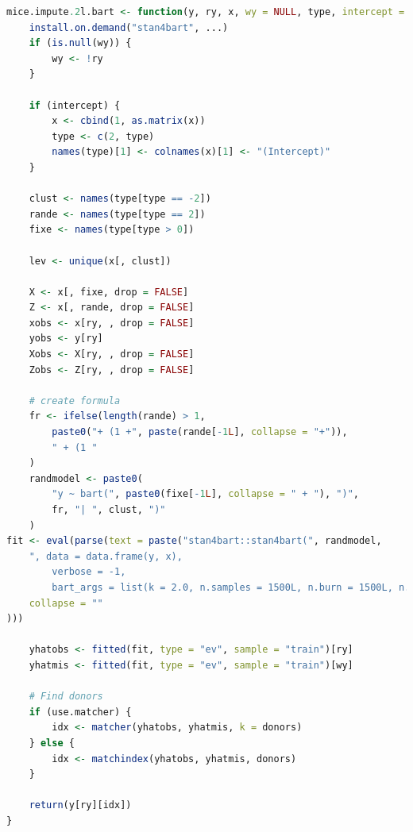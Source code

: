 \documentclass[10pt, a4paper, titlepage]{article}
\begin{document}
\begin{lstlisting}[language=R, caption={Imputation function for multilevel BART with random effects and cross-level interactions}, label={lst:multilevelBART}]
    mice.impute.2l.bart <- function(y, ry, x, wy = NULL, type, intercept = TRUE, use.matcher = FALSE, donors = 5L, ...) {
    install.on.demand("stan4bart", ...)
    if (is.null(wy)) {
        wy <- !ry
    }

    if (intercept) {
        x <- cbind(1, as.matrix(x))
        type <- c(2, type)
        names(type)[1] <- colnames(x)[1] <- "(Intercept)"
    }

    clust <- names(type[type == -2])
    rande <- names(type[type == 2])
    fixe <- names(type[type > 0])

    lev <- unique(x[, clust])

    X <- x[, fixe, drop = FALSE]
    Z <- x[, rande, drop = FALSE]
    xobs <- x[ry, , drop = FALSE]
    yobs <- y[ry]
    Xobs <- X[ry, , drop = FALSE]
    Zobs <- Z[ry, , drop = FALSE]

    # create formula
    fr <- ifelse(length(rande) > 1,
        paste0("+ (1 +", paste(rande[-1L], collapse = "+")),
        " + (1 "
    )
    randmodel <- paste0(
        "y ~ bart(", paste0(fixe[-1L], collapse = " + "), ")",
        fr, "| ", clust, ")"
    )
fit <- eval(parse(text = paste("stan4bart::stan4bart(", randmodel,
    ", data = data.frame(y, x),
        verbose = -1,
        bart_args = list(k = 2.0, n.samples = 1500L, n.burn = 1500L, n.thin = 5L))",
    collapse = ""
)))

    yhatobs <- fitted(fit, type = "ev", sample = "train")[ry]
    yhatmis <- fitted(fit, type = "ev", sample = "train")[wy]

    # Find donors
    if (use.matcher) {
        idx <- matcher(yhatobs, yhatmis, k = donors)
    } else {
        idx <- matchindex(yhatobs, yhatmis, donors)
    }

    return(y[ry][idx])
}
\end{lstlisting}

\newpage


\end{document}

